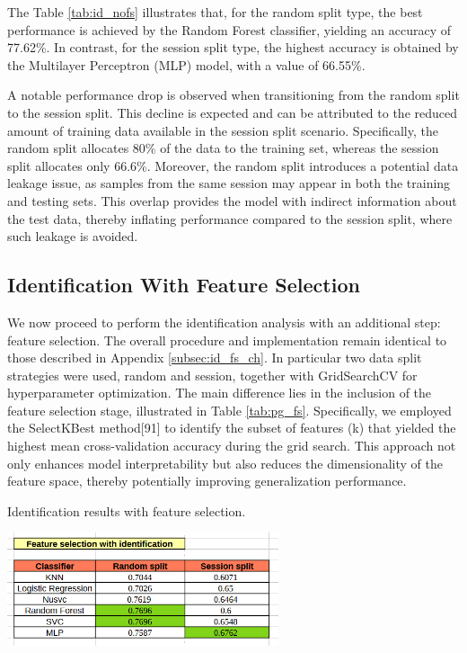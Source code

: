 \documentclass[12pt]{report}
\begin{document}
The Table \ref{tab:id_nofs} illustrates that, for the random split type, the best performance is achieved by the Random Forest classifier, yielding an accuracy of 77.62\%.
In contrast, for the session split type, the highest accuracy is obtained by the Multilayer Perceptron (MLP) model, with a value of 66.55\%.

A notable performance drop is observed when transitioning from the random split to the session split. 
This decline is expected and can be attributed to the reduced amount of training data available in the session split scenario. 
Specifically, the random split allocates 80\% of the data to the training set, whereas the session split allocates only 66.6\%.
Moreover, the random split introduces a potential data leakage issue, as samples from the same session may appear in both the training and testing sets. 
This overlap provides the model with indirect information about the test data, thereby inflating performance compared to the session split, where such leakage is avoided.
\FloatBarrier

\subsection{Identification With Feature Selection}

We now proceed to perform the identification analysis with an additional step: feature selection.
The overall procedure and implementation remain identical to those described in Appendix \ref{subsec:id_fs_ch}.
In particular two data split strategies were used, random and session, together with GridSearchCV for hyperparameter optimization.
The main difference lies in the inclusion of the feature selection stage, illustrated in Table \ref{tab:pg_fs}. 
Specifically, we employed the SelectKBest method[91] to identify the subset of features (k) that yielded the highest mean cross-validation accuracy during the grid search.
This approach not only enhances model interpretability but also reduces the dimensionality of the feature space, thereby potentially improving generalization performance.

\begin{table}[ht]
    \centering
    \caption{Identification results with feature selection.}
    \includegraphics[width=0.6\textwidth]{Images/Results/Identification/fs.png}
    \label{tab:id_fs}
\end{table}
\end{document}
